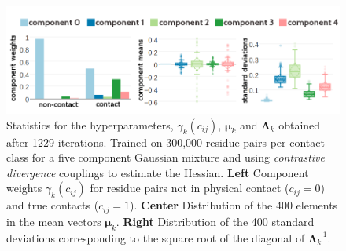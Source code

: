 \documentclass[11pt,a4paper,twoside]{book}
\newcommand{\eq}{\!=\!}
\newcommand{\Lk}{\mathbf{\Lambda}_k}
\newcommand{\muk}{\mathbf{\mu}_k}
\newcommand{\cij}{c_{ij}}
\theoremstyle{definition}
\theoremstyle{definition}
\theoremstyle{remark}
\begin{document}
\begin{figure}
\includegraphics[width=1\linewidth]{img/bayesian_model/cd/5/stats-cd-5comp-300k_contactthr25} \caption{Statistics for the hyperparameters,
\(\gamma_k(\cij)\), \(\muk\) and \(\Lk\) obtained after 1229 iterations.
Trained on 300,000 residue pairs per contact class for a five component
Gaussian mixture and using \emph{contrastive divergence} couplings to
estimate the Hessian. \textbf{Left} Component weights \(\gamma_k(\cij)\)
for residue pairs not in physical contact (\(\cij \eq 0\)) and true
contacts (\(\cij \eq 1\)). \textbf{Center} Distribution of the 400
elements in the mean vectors \(\muk\). \textbf{Right} Distribution of
the 400 standard deviations corresponding to the square root of the
diagonal of \(\Lk^{-1}\).}\label{fig:stats-cd-5comp-300k}
\end{figure}
\end{document}
